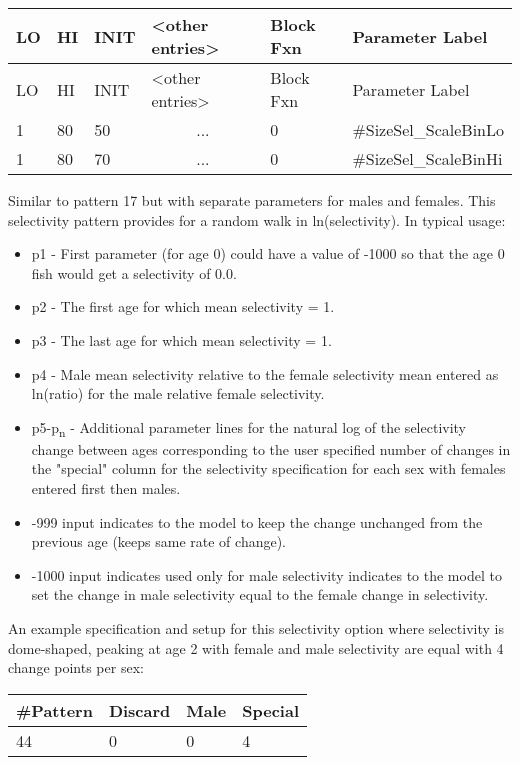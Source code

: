 	\begin{longtable}{p{1cm} p{1cm} p{1cm} p{2.9cm}  p{1.9cm}  p{4.2cm}}
		\hline
		LO \Tstrut & HI & INIT  &  <other entries> & Block Fxn & Parameter Label\Bstrut\\
		\hline
		\endfirsthead
	
		\hline
		LO \Tstrut & HI & INIT & <other entries> & Block Fxn & Parameter Label\Bstrut\\
		\hline
		\endhead

		1 & 80 & 50 & \multicolumn{1}{c}{...} & 0 & \#SizeSel\_ScaleBinLo\Tstrut\\
		1 & 80 & 70 & \multicolumn{1}{c}{...} & 0 & \#SizeSel\_ScaleBinHi\Bstrut\\
		\hline
	\end{longtable}

Similar to pattern 17 but with separate parameters for males and females. This selectivity pattern provides for a random walk in ln(selectivity).  In typical usage:
	\begin{itemize}
		\item p1 - First parameter (for age 0) could have a value of -1000 so that the age 0 fish would get a selectivity of 0.0.
		\item p2 - The first age for which mean selectivity = 1.
		\item p3 - The last age for which mean selectivity = 1.
		\item p4 - Male mean selectivity relative to the female selectivity mean entered as ln(ratio) for the male relative female selectivity.
		\item p5-p\textsubscript{n} - Additional parameter lines for the natural log of the selectivity change between ages corresponding to the user specified number of changes in the "special" column for the selectivity specification for each sex with females entered first then males.
		\item -999 input indicates to the model to keep the change unchanged from the previous age (keeps same rate of change).
		\item -1000 input indicates used only for male selectivity indicates to the model to set the change in male selectivity equal to the female change in selectivity.
	\end{itemize}
	
An example specification and setup for this selectivity option where selectivity is dome-shaped, peaking at age 2 with female and male selectivity are equal with 4 change points per sex:
	\begin{center}
		\begin{longtable}{p{1.5cm} p{1.5cm} p{1.5cm} p{1.5cm} }
			\hline
			\#Pattern & Discard & Male & Special\Tstrut\Bstrut\\
			\hline
			44 & 0 & 0 & 4 \Tstrut\Bstrut\\
			\hline
		\end{longtable}
	\end{center}

